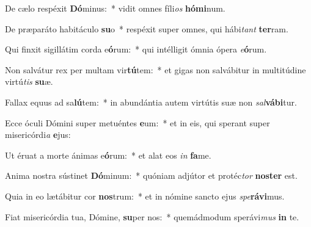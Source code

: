 \item De cælo respéxit \textbf{Dó}minus:~* vidit omnes fíli\textit{os} \textbf{hó}\textbf{mi}num.
\item De præparáto habitáculo \textbf{su}o~* respéxit super omnes, qui hábi\textit{tant} \textbf{ter}ram.
\item Qui finxit sigillátim corda e\textbf{ó}rum:~* qui intélligit ómnia ópera \textit{e}\textbf{ó}rum.
\item Non salvátur rex per multam vir\textbf{tú}tem:~* et gigas non salvábitur in multitúdine virtú\textit{tis} \textbf{su}æ.
\item Fallax equus ad sa\textbf{lú}tem:~* in abundántia autem virtútis suæ non \textit{sal}\textbf{vá}\textbf{bi}tur.
\item Ecce óculi Dómini super metuéntes \textbf{e}um:~* et in eis, qui sperant super misericórdi\textit{a} \textbf{e}jus:
\item Ut éruat a morte ánimas e\textbf{ó}rum:~* et alat eos \textit{in} \textbf{fa}me.
\item Anima nostra sústinet \textbf{Dó}minum:~* quóniam adjútor et protéc\textit{tor} \textbf{nos}\textbf{ter} est.
\item Quia in eo lætábitur cor \textbf{nos}trum:~* et in nómine sancto ejus \textit{spe}\textbf{rá}\textbf{vi}mus.
\item Fiat misericórdia tua, Dómine, \textbf{su}per nos:~* quemádmodum sperávi\textit{mus} \textbf{in} te.
